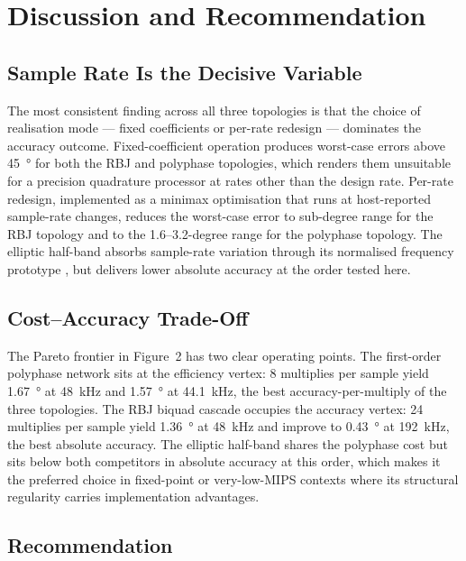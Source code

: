 \documentclass[11pt,a4paper]{article}
\begin{document}
\section{Discussion and Recommendation}

\subsection{Sample Rate Is the Decisive Variable}

The most consistent finding across all three topologies is that the choice of
realisation mode — fixed coefficients or per-rate redesign — dominates the
accuracy outcome.
Fixed-coefficient operation produces worst-case errors above \SI{45}{\degree}
for both the RBJ and polyphase topologies, which renders them unsuitable for a
precision quadrature processor at rates other than the design rate.
Per-rate redesign, implemented as a minimax optimisation \cite{Lang1998Allpass}
that runs at host-reported sample-rate changes, reduces the worst-case error
to sub-degree range for the RBJ topology and to the 1.6–3.2-degree range for
the polyphase topology.
The elliptic half-band absorbs sample-rate variation through its normalised
frequency prototype \cite{HarrisBerdahlAbel2010,SchusslerSteffen1998}, but
delivers lower absolute accuracy at the order tested here.

\subsection{Cost–Accuracy Trade-Off}

The Pareto frontier in Figure~2 has two clear operating points.
The first-order polyphase network \cite{Niemitalo2003} sits at the
efficiency vertex: 8 multiplies per sample yield \SI{1.67}{\degree} at
\SI{48}{\kilo\hertz} and \SI{1.57}{\degree} at \SI{44.1}{\kilo\hertz}, the
best accuracy-per-multiply of the three topologies.
The RBJ biquad cascade occupies the accuracy vertex: 24 multiplies per sample
yield \SI{1.36}{\degree} at \SI{48}{\kilo\hertz} and improve to
\SI{0.43}{\degree} at \SI{192}{\kilo\hertz}, the best absolute accuracy.
The elliptic half-band shares the polyphase cost but sits below both
competitors in absolute accuracy at this order, which makes it the preferred
choice in fixed-point or very-low-MIPS contexts where its structural
regularity carries implementation advantages.

\subsection{Recommendation}
\end{document}
